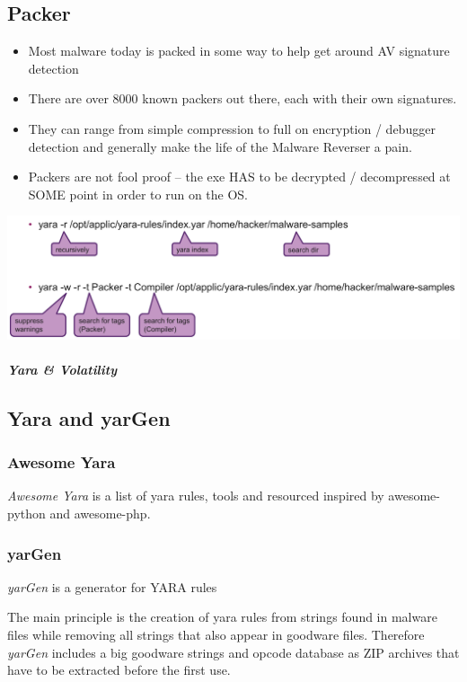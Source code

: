 \subsection{Packer}
\begin{itemize}
    \item Most malware today is packed in some way to help get around AV signature detection
    \item There are over 8000 known packers out there, each with their own signatures.
    \item They can range from simple compression to full on encryption / debugger detection and generally make the life of the Malware Reverser a pain.
    \item Packers are not fool proof – the exe HAS to be decrypted / decompressed at SOME point in order to run on the OS.
\end{itemize}
\includegraphics[width=\linewidth]{./img/13-yara/yara_cli.png}

\subparagraph{Yara \& Volatility}
\subsection{Yara and yarGen}

\subsubsection{Awesome Yara}
\textit{Awesome Yara} is a list of yara rules, tools and resourced inspired by awesome-python and awesome-php.

\subsubsection{yarGen}
\textit{yarGen} is a generator for YARA rules

The main principle is the creation of yara rules from strings found in malware files while removing all strings that also appear in goodware files. Therefore \textit{yarGen} includes a big goodware strings and opcode database as ZIP archives that have to be extracted before the first use.

